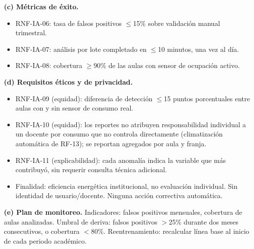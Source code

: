 \textbf{(c) M\'etricas de \'exito.}
\begin{itemize}[nosep]
\item RNF-IA-06: tasa de falsos positivos $\leq$15\% sobre validaci\'on manual trimestral.
\item RNF-IA-07: an\'alisis por lote completado en $\leq$10 minutos, una vez al d\'ia.
\item RNF-IA-08: cobertura $\geq$90\% de las aulas con sensor de ocupaci\'on activo.
\end{itemize}

\textbf{(d) Requisitos \'eticos y de privacidad.}
\begin{itemize}[nosep]
\item RNF-IA-09 (equidad): diferencia de detecci\'on $\leq$15 puntos porcentuales entre aulas con y sin sensor de consumo real.
\item RNF-IA-10 (equidad): los reportes no atribuyen responsabilidad individual a un docente por consumo que no controla directamente (climatizaci\'on autom\'atica de RF-13); se reportan agregados por aula y franja.
\item RNF-IA-11 (explicabilidad): cada anomal\'ia indica la variable que m\'as contribuy\'o, sin requerir consulta t\'ecnica adicional.
\item Finalidad: eficiencia energ\'etica institucional, no evaluaci\'on individual. Sin identidad de usuario/docente. Ninguna acci\'on correctiva autom\'atica.
\end{itemize}

\textbf{(e) Plan de monitoreo.} Indicadores: falsos positivos mensuales, cobertura de aulas analizadas. Umbral de deriva: falsos positivos $>$25\% durante dos meses consecutivos, o cobertura $<$80\%. Reentrenamiento: recalcular l\'inea base al inicio de cada periodo acad\'emico.
